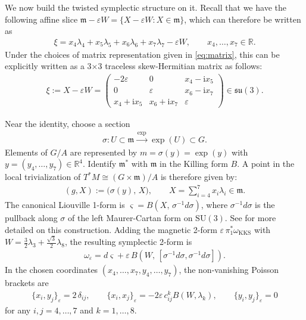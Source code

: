 \documentclass[11pt]{amsart}
\theoremstyle{definition}
\theoremstyle{plain}
\theoremstyle{conclusion}
\begin{document}
We now build the twisted symplectic structure on it. Recall that we have the following affine slice  $  \mathfrak{m}-\varepsilon W  =\{X-\varepsilon W:X\in\mathfrak{m}\} $, which can therefore be written as \begin{align*}
\xi  =x_4\lambda_4+x_5\lambda_5+x_6\lambda_6+x_7\lambda_7-\varepsilon W, \qquad x_4,\ldots ,x_7\in\mathbb{R} .
\end{align*} Under the choices of matrix representation given in \eqref{eq:matrix}, this can be explicitly written as a 3$\times$3 traceless skew-Hermitian matrix as follows: \begin{align}
  \xi:=  X-\varepsilon W= \begin{pmatrix}
-2\varepsilon &0& x_4-\mathrm{i}x_5\\[6pt]
0 &\varepsilon & x_6-\mathrm{i}x_7\\[6pt]
x_4+\mathrm{i}x_5 & x_6+\mathrm{i}x_7 & \varepsilon
\end{pmatrix}\in\mathfrak{su}(3). \label{eq:ximatrixsu(3)}
\end{align} 



 Near the identity, choose a section \begin{align*}
    \sigma: U\subset\mathfrak{m}\xrightarrow{\,\exp\,}\exp(U)\subset G   .
\end{align*} Elements of $G/A$ are represented by $m=\sigma(y) = \exp(y)$ with $y=(y_4,\ldots ,y_7) \in \mathbb{R}^{4}$. Identify $\mathfrak{m}^*$ with $\mathfrak{m}$ in the Killing form $B$. A point in the local trivialization of $T^*M \cong (G \times \mathfrak{m})/A $ is therefore given by:  \begin{align}
    (g,X):=\bigl(\sigma(y),\,X\bigr), \qquad X=\sum_{i= 4}^{7}x_i\lambda_i\in\mathfrak{m}.
\end{align}    The canonical Liouville 1-form is $\varsigma=B( X,\,\sigma^{-1}d\sigma)$, where $\sigma^{-1}d\sigma$ is the pullback along $\sigma$ of the left Maurer-Cartan form on $\mathrm{SU}(3)$. See \cite[Proof of Proposition 2.12]{Davis2012HomogeneousSymplecticGalilei} for more detailed on this construction. Adding the magnetic 2-form $\varepsilon\,\pi_1^*\omega_{\mathrm{KKS}}$ with $W =\frac{3}{2}\lambda_3+\frac{\sqrt3}{2}\lambda_8$, the resulting symplectic 2-form is \begin{align*}
   \omega_{\varepsilon}  =d\varsigma + \varepsilon\,B( W,\,[\sigma^{-1}d\sigma,\sigma^{-1}d\sigma]) . 
\end{align*} In the chosen coordinates $(x_4,\ldots,x_7,y_4,\ldots,y_7)$, the non-vanishing Poisson brackets are \begin{align*}
    \{x_i,y_j\}_\varepsilon=2\,\delta_{ij}, \qquad \{x_i,x_j\}_\varepsilon=-2\varepsilon\,c_{ij}^k B( W,\lambda_k), \qquad \{y_i,y_j\}_\varepsilon=0  
\end{align*} for any $i,j= 4,\ldots ,7$ and $k = 1,\ldots,8$.
\end{document}
